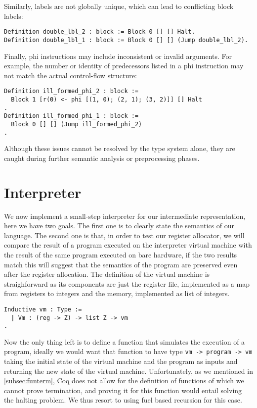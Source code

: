 Similarly, labels are not globally unique, which can lead to conflicting block labels:

\begin{lstlisting}[language=Coq]
Definition double_lbl_2 : block := Block 0 [] [] Halt.
Definition double_lbl_1 : block := Block 0 [] [] (Jump double_lbl_2).
\end{lstlisting}

Finally, phi instructions may include inconsistent or invalid arguments. For example, the number or identity of predecessors listed in a phi instruction may not match the actual control-flow structure:

\begin{lstlisting}[language=Coq]
Definition ill_formed_phi_2 : block :=
  Block 1 [r(0) <- phi [(1, 0); (2, 1); (3, 2)]] [] Halt
.
Definition ill_formed_phi_1 : block :=
  Block 0 [] [] (Jump ill_formed_phi_2)
.
\end{lstlisting}

Although these issues cannot be resolved by the type system alone, they are caught during further semantic analysis or preprocessing phases.

\section{Interpreter}

We now implement a small-step interpreter for our intermediate representation, here we have two goals.
The first one is to clearly state the semantics of our language. The second one is that, in order to test our register allocator, we will compare the result of a program executed on the interpreter virtual machine with the result of the same program executed on bare hardware, if the two results match this will suggest that the semantics of the program are preserved even after the register allocation.
The definition of the virtual machine is straighforward as its components are just the register file, implemented as a map from registers to integers and the memory, implemented as list of integers.

\begin{lstlisting}[language=Coq]
Inductive vm : Type :=
  | Vm : (reg -> Z) -> list Z -> vm
.
\end{lstlisting}

Now the only thing left is to define a function that simulates the execution of a program, ideally we would want that function to have type \texttt{vm -> program -> vm} taking the initial state of the virtual machine and the program as inputs and returning the new state of the virtual machine.
Unfortunately, as we mentioned in \cref{subsec:funterm}, Coq does not allow for the definition of functions of which we cannot prove termination, and proving it for this function would entail solving the halting problem. We thus resort to using fuel based recursion for this case.

